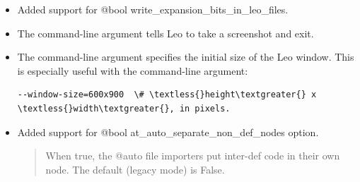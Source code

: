 \documentclass[a4paper,10pt,english]{sphinxmanual}
\begin{document}
\begin{itemize}
\item {} 
Added support for @bool write\_expansion\_bits\_in\_leo\_files.

\item {} 
The  command-line argument tells Leo to take a screenshot and exit.

\item {} 
The  command-line argument specifies the initial size of the Leo
window.  This is especially useful with the  command-line argument:

\begin{Verbatim}[commandchars=\\\{\}]
--window-size=600x900  \# \textless{}height\textgreater{} x \textless{}width\textgreater{}, in pixels.
\end{Verbatim}

\item {} 
Added support for @bool at\_auto\_separate\_non\_def\_nodes option.
\begin{quote}

When true, the @auto file importers put inter-def code in their own node.
The default (legacy mode) is False.
\end{quote}

\end{itemize}
\end{document}
